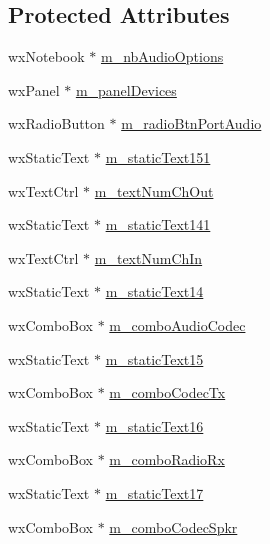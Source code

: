 \subsection*{Protected Attributes}
\begin{DoxyCompactItemize}
\item 
wx\-Notebook $\ast$ \hyperlink{class_dlg_audio_ac45627cdbbcdaa2e3400c08f6fe9cfe6}{m\-\_\-nb\-Audio\-Options}
\item 
wx\-Panel $\ast$ \hyperlink{class_dlg_audio_a74808776e03014a3b3dcbf03bb8f6dbe}{m\-\_\-panel\-Devices}
\item 
wx\-Radio\-Button $\ast$ \hyperlink{class_dlg_audio_a44c3e54a014e7a4e921398bddc6681c7}{m\-\_\-radio\-Btn\-Port\-Audio}
\item 
wx\-Static\-Text $\ast$ \hyperlink{class_dlg_audio_a6cdf994e898954407e2b064e3aa5b0b7}{m\-\_\-static\-Text151}
\item 
wx\-Text\-Ctrl $\ast$ \hyperlink{class_dlg_audio_a35f852fc3c494b83ceb14d2d5c1ad6db}{m\-\_\-text\-Num\-Ch\-Out}
\item 
wx\-Static\-Text $\ast$ \hyperlink{class_dlg_audio_ac99a630f69e15e73d3942d0338ccae66}{m\-\_\-static\-Text141}
\item 
wx\-Text\-Ctrl $\ast$ \hyperlink{class_dlg_audio_a0d5cd2fc25435939bf8ca2dc2c4fa9b7}{m\-\_\-text\-Num\-Ch\-In}
\item 
wx\-Static\-Text $\ast$ \hyperlink{class_dlg_audio_adfd283017fa96c14f349368961bd4737}{m\-\_\-static\-Text14}
\item 
wx\-Combo\-Box $\ast$ \hyperlink{class_dlg_audio_ac59893eccfb75467afd792051119067c}{m\-\_\-combo\-Audio\-Codec}
\item 
wx\-Static\-Text $\ast$ \hyperlink{class_dlg_audio_adf762645da78b3948bc1fe8ba31b1444}{m\-\_\-static\-Text15}
\item 
wx\-Combo\-Box $\ast$ \hyperlink{class_dlg_audio_aeaf78c48df4b0314dc4dc06bfa2244b7}{m\-\_\-combo\-Codec\-Tx}
\item 
wx\-Static\-Text $\ast$ \hyperlink{class_dlg_audio_a90f47825bd359dfde13a0f2e6aa34e69}{m\-\_\-static\-Text16}
\item 
wx\-Combo\-Box $\ast$ \hyperlink{class_dlg_audio_aa2cf1a98f25e26545da3044b354ba9a6}{m\-\_\-combo\-Radio\-Rx}
\item 
wx\-Static\-Text $\ast$ \hyperlink{class_dlg_audio_aab6e9f04d01aff925f76195da96471fc}{m\-\_\-static\-Text17}
\item 
wx\-Combo\-Box $\ast$ \hyperlink{class_dlg_audio_af35d36a3df31c77480d7714e08533d58}{m\-\_\-combo\-Codec\-Spkr}

\end{DoxyCompactItemize}
